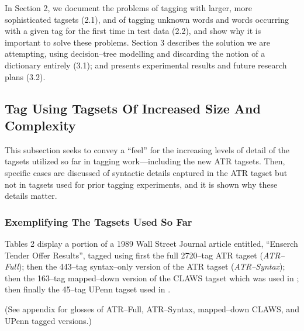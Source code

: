 In Section 2, we document the problems of tagging with larger, more
sophisticated tagsets (2.1), and of tagging unknown words and words
occurring with a given tag for the first time in test data (2.2), and
show why it is important to solve these problems. Section 3 describes
the solution we are attempting, using decision--tree modelling and
discarding the notion of a dictionary entirely (3.1); and presents
experimental results and future research plans (3.2).

\subsection{Tag Using Tagsets Of Increased Size And Complexity}

This subsection seeks to convey a ``feel'' for the increasing levels
of detail of the tagsets utilized so far in tagging work---including
the new ATR tagsets. Then, specific cases are discussed of syntactic
details captured in the ATR tagset but not in tagsets used for prior
tagging experiments, and it is shown why these details matter.

\subsubsection{Exemplifying The Tagsets Used So Far}

Tables 2 display a portion of a 1989 Wall Street Journal
article entitled, ``Enserch Tender Offer Results'', tagged using first
the full 2720--tag ATR tagset ({\em ATR--Full}); then the 443--tag
syntax--only version of the ATR tagset ({\em ATR--Syntax}); then the
163--tag mapped--down version of the CLAWS tagset which was used in
\cite{Black+al:tag}; then finally the 45--tag UPenn tagset used in
\cite{Brill:advances}.

(See appendix for glosses of ATR--Full, ATR--Syntax, mapped--down CLAWS,
and UPenn tagged versions.)

